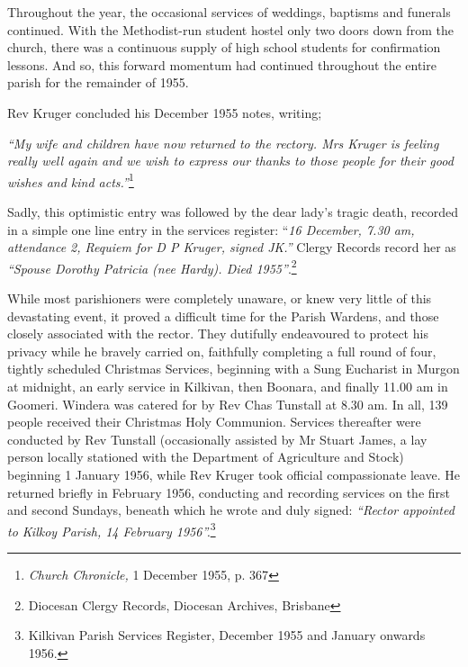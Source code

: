 Throughout the year, the occasional services of weddings, baptisms and funerals continued. With the Methodist-run student hostel only two doors down from the church, there was a continuous supply of high school students for confirmation lessons. And so, this forward momentum had continued throughout the entire parish for the remainder of 1955.



Rev Kruger concluded his December 1955 notes, writing;



\emph{``My wife and children have now returned to the rectory. Mrs Kruger is feeling really well again and we wish to express our thanks to those people for their good wishes and kind acts.''}\footnote{\emph{Church Chronicle,} 1 December 1955, p. 367}


\smallskip


Sadly, this optimistic entry was followed by the dear lady's tragic death, recorded in a simple one line entry in the services register: ``\emph{16 December, 7.30 am, attendance 2, Requiem for D P Kruger, signed JK.''} Clergy Records record her as \emph{``Spouse Dorothy Patricia (nee Hardy). Died 1955''}.\footnote{Diocesan Clergy Records, Diocesan Archives, Brisbane}


\smallskip


While most parishioners were completely unaware, or knew very little of this devastating event, it proved a difficult time for the Parish Wardens, and those closely associated with the rector. They dutifully endeavoured to protect his privacy while he bravely carried on, faithfully completing a full round of four, tightly scheduled Christmas Services, beginning with a Sung Eucharist in Murgon at midnight, an early service in Kilkivan, then Boonara, and finally 11.00 am in Goomeri. Windera was catered for by Rev Chas Tunstall at 8.30 am. In all, 139 people received their Christmas Holy Communion. Services thereafter were conducted by Rev Tunstall (occasionally assisted by Mr Stuart James, a lay person locally stationed with the Department of Agriculture and Stock) beginning 1 January 1956, while Rev Kruger took official compassionate leave. He returned briefly in February 1956, conducting and recording services on the first and second Sundays, beneath which he wrote and duly signed: \emph{``Rector appointed to Kilkoy Parish, 14 February 1956''.}\footnote{Kilkivan Parish Services Register, December 1955 and January onwards 1956.}


